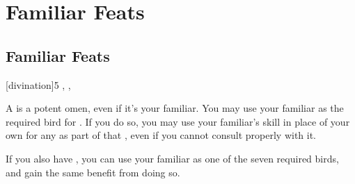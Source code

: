 \chapter{Familiar Feats}

\section{Familiar Feats}

[divination]{5}{
	,
	,
}{
	A  is a potent omen, even if it's your familiar.
	You may use your familiar as the required bird for .
	If you do so, you may use your familiar's  skill in place of your own for any {\tests} as part of that , even if you cannot consult properly with it.
	
	If you also have , you can use your familiar as one of the seven required birds, and gain the same benefit from doing so.
}
